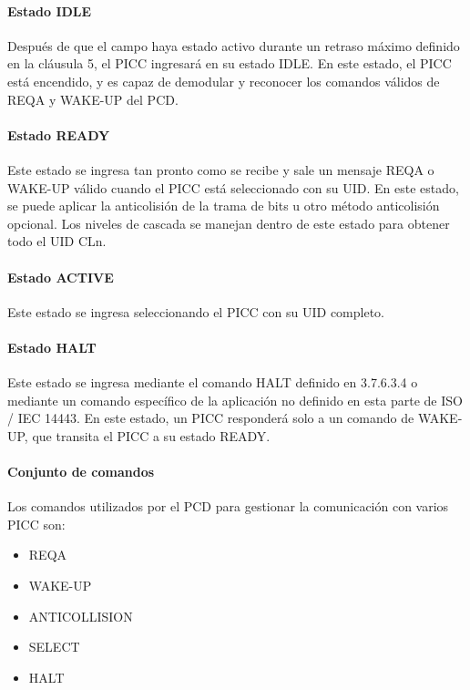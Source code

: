 \paragraph{Estado IDLE}
Después de que el campo haya estado activo durante un retraso máximo definido en la cláusula 5, el PICC ingresará en su estado IDLE. En este estado, el PICC está encendido, y es capaz de demodular y reconocer los comandos válidos de REQA y WAKE-UP del PCD.\par

\paragraph{Estado READY}
Este estado se ingresa tan pronto como se recibe y sale un mensaje REQA o WAKE-UP válido cuando el PICC está seleccionado con su UID. En este estado, se puede aplicar la anticolisión de la trama de bits u otro método anticolisión opcional. Los niveles de cascada se manejan dentro de este estado para obtener todo el UID CLn.\par

\paragraph{Estado ACTIVE}
Este estado se ingresa seleccionando el PICC con su UID completo.\par

\paragraph{Estado HALT}
Este estado se ingresa mediante el comando HALT definido en 3.7.6.3.4 o mediante un comando específico de la aplicación no definido en esta parte de ISO / IEC 14443. En este estado, un PICC responderá solo a un comando de WAKE-UP, que transita el PICC a su estado READY.\par

\paragraph{Conjunto de comandos}
Los comandos utilizados por el PCD para gestionar la comunicación con varios PICC son:\par

\begin{itemize}
	\item REQA\par

	\item WAKE-UP\par

	\item ANTICOLLISION\par

	\item SELECT\par

	\item HALT
\end{itemize}\par


